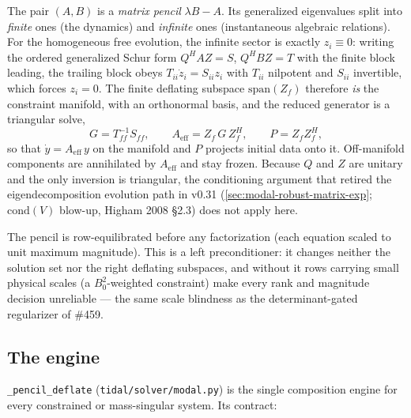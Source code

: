 The pair $(A, B)$ is a \emph{matrix pencil} $\lambda B - A$. Its
generalized eigenvalues split into \emph{finite} ones (the dynamics) and
\emph{infinite} ones (instantaneous algebraic relations). For the
homogeneous free evolution, the infinite sector is exactly $z_i \equiv 0$:
writing the ordered generalized Schur form
$Q^H A Z = S$, $Q^H B Z = T$ with the finite block leading, the trailing
block obeys $T_{ii}\dot z_i = S_{ii} z_i$ with $T_{ii}$ nilpotent and
$S_{ii}$ invertible, which forces $z_i = 0$. The finite deflating
subspace $\mathrm{span}(Z_f)$ therefore \emph{is} the constraint
manifold, with an orthonormal basis, and the reduced generator is a
triangular solve,
\begin{equation}
  G = T_{ff}^{-1} S_{ff}, \qquad
  A_\text{eff} = Z_f\, G\, Z_f^H, \qquad
  P = Z_f Z_f^H ,
  \label{eq:pencil-deflation}
\end{equation}
so that $\dot y = A_\text{eff}\, y$ on the manifold and $P$ projects
initial data onto it. Off-manifold components are annihilated by
$A_\text{eff}$ and stay frozen. Because $Q$ and $Z$ are unitary and the
only inversion is triangular, the conditioning argument that retired the
eigendecomposition evolution path in v0.31 (\cref{sec:modal-robust-matrix-exp};
$\mathrm{cond}(V)$ blow-up, Higham 2008 \S2.3) does not apply here.

The pencil is row-equilibrated before any factorization (each equation
scaled to unit maximum magnitude). This is a left preconditioner: it
changes neither the solution set nor the right deflating subspaces, and
without it rows carrying small physical scales (a $B_0^2$-weighted
constraint) make every rank and magnitude decision unreliable --- the
same scale blindness as the determinant-gated regularizer of \#459.

\subsection{The engine}
\label{sec:pencil-engine-impl}

\texttt{\_pencil\_deflate} (\texttt{tidal/solver/modal.py}) is the single
composition engine for every constrained or mass-singular system. Its
contract:

